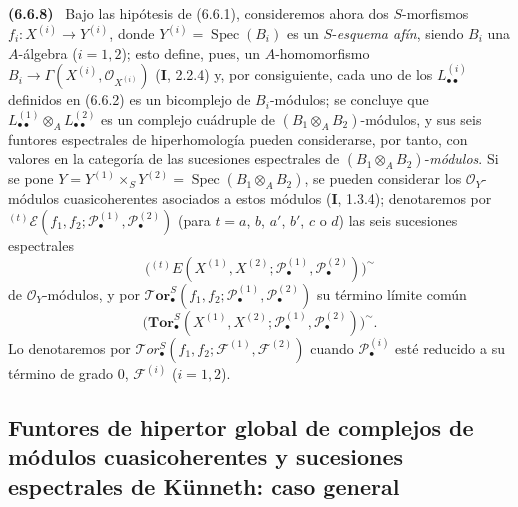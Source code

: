 \documentclass[10pt,oneside]{book}
\newenvironment{env}[1][]{\par\medskip\noindent\textbf{(#1)}\ }{\par}
\begin{document}
\begin{env}[6.6.8]
\label{III.6.6.8}
Bajo las hipótesis de (6.6.1), consideremos ahora dos $S$-morfismos
$f_i:X^{(i)}\to Y^{(i)}$, donde
$Y^{(i)}=\operatorname{Spec}(B_i)$ es un $S$-\emph{esquema afín}, siendo
$B_i$ una $A$-álgebra ($i=1,2$); esto define, pues, un $A$-homomorfismo
$B_i\to\Gamma(X^{(i)},\mathscr O_{X^{(i)}})$ (\textbf I, 2.2.4) y, por consiguiente,
cada uno de los $L_{\bullet\bullet}^{(i)}$ definidos en (6.6.2) es un
bicomplejo de $B_i$-módulos; se concluye que
$L_{\bullet\bullet}^{(1)}\otimes_A L_{\bullet\bullet}^{(2)}$ es un
complejo cuádruple de $(B_1\otimes_A B_2)$-módulos, y sus seis funtores
espectrales de hiperhomología pueden considerarse, por tanto, con valores en
la categoría de las sucesiones espectrales de
$(B_1\otimes_A B_2)$-\emph{módulos}. Si se pone
$Y=Y^{(1)}\times_S Y^{(2)}=\operatorname{Spec}(B_1\otimes_A B_2)$, se pueden
considerar los $\mathscr O_Y$-módulos cuasicoherentes asociados a estos
módulos (\textbf I, 1.3.4); denotaremos por
${}^{(t)}\mathscr E
(f_1,f_2;\mathscr P_\bullet^{(1)},\mathscr P_\bullet^{(2)})$
(para $t=a$, $b$, $a'$, $b'$, $c$ o $d$) las seis sucesiones espectrales
\[
  \bigl({}^{(t)}E
  (X^{(1)},X^{(2)};
   \mathscr P_\bullet^{(1)},\mathscr P_\bullet^{(2)})\bigr)^{\sim}
\]
de $\mathscr O_Y$-módulos, y por
$\boldsymbol{\mathscr T\!or}_\bullet^S
(f_1,f_2;\mathscr P_\bullet^{(1)},\mathscr P_\bullet^{(2)})$ su término
límite común
\[
  \bigl(\mathbf{Tor}_\bullet^S
  (X^{(1)},X^{(2)};
   \mathscr P_\bullet^{(1)},\mathscr P_\bullet^{(2)})\bigr)^{\sim}.
\]
Lo denotaremos por
$\mathscr T\!or_\bullet^S(f_1,f_2;\mathscr F^{(1)},\mathscr F^{(2)})$
cuando $\mathscr P_\bullet^{(i)}$ esté reducido a su término de grado 0,
$\mathscr F^{(i)}$ ($i=1,2$).
\end{env}

\subsection{Funtores de hipertor global de complejos de módulos
cuasicoherentes y sucesiones espectrales de Künneth: caso general}
\label{subsection:III.6.7}
\end{document}
